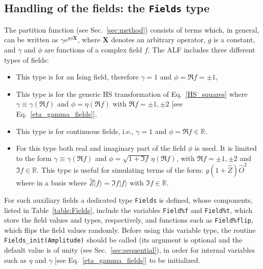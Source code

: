\subsection{Handling of the fields: the \texttt{Fields} type} \label{sec:fields}

The partition function (see Sec.~\ref{sec:method}) consists of terms which, in general, can be written as $\gamma e^{g \phi \bm{X} }$, where $\bm{X}$ denotes an arbitrary operator, $g$ is a constant, and $\gamma$ and $\phi$ are   functions  of  a  complex  field  $f$. 
The ALF includes three different types of fields:
\begin{itemize}
\item[\texttt{t=1}]   This type is for an  Ising field, therefore $\gamma= 1$ and $ \phi = \Re f =  \pm 1$,
\item[\texttt{t=2}]   This type is for the generic HS  transformation of Eq.~\eqref{HS_squares} where  $\gamma \equiv \gamma(\Re f) $  and $ \phi = \eta(\Re f)$  with $\Re f  = \pm 1, \pm 2$ [see Eq.~\eqref{eta_gamma_fields}],
\item[\texttt{t=3}]   This type is for continuous fields, i.e., $\gamma= 1$  and $ \phi   =  \Re f  \in \mathbb R $.
\item[\texttt{t=4}]    For  this  type  both  real and  imaginary  part  of   the  field   $\phi$ is  used.    It is  limited  to  the  
form 
	$\gamma \equiv \gamma(\Re f)$  and  $  \phi =   \sqrt{ 1 + \Im f}  \,   \eta(\Re f ) $, 
with $ \Re{f} =  \pm 1, \pm 2$    and   $ \Im{f}  \in \mathbb{R} $.   This   type  is  useful     for  simulating    terms  of    the  form: $  g (1 +  \hat{Z})  \hat{O}^2 $  where 
in a  basis   where  $\hat{Z} | f  \rangle  =     \Im  f   |  f  \rangle $  with  $ \Im f  \in \mathbb{R} $. 
\end{itemize}

For such auxiliary fields a dedicated type \texttt{Fields} is defined, whose components, listed in Table~\ref{table:Fields}, include the variables \texttt{Field\%f} and \texttt{Field\%t}, which store the field values and types, respectively, and functions such as \texttt{Field\%flip}, which flips the field values randomly. Before using this variable type, the routine \texttt{Fields\_init(Amplitude)} should be called (its argument is optional and the default value is of unity (see Sec.~\ref{sec:sequential}), in order for internal variables such as  $\eta$ and $\gamma$  [see Eq.~\eqref{eta_gamma_fields}] to be initialized.



